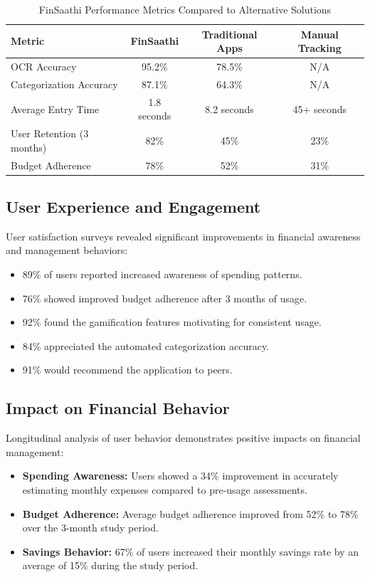 \documentclass[10pt,twocolumn,twoside,a4paper]{article}
\begin{document}
\begin{table}[H]
  \centering
  \caption{FinSaathi Performance Metrics Compared to Alternative Solutions}
  \begin{tabular}{@{}lccc@{}}
    \toprule
    \textbf{Metric} & \textbf{FinSaathi} & \textbf{Traditional Apps} & \textbf{Manual Tracking} \\
    \midrule
    OCR Accuracy & 95.2\% & 78.5\% & N/A \\
    Categorization Accuracy & 87.1\% & 64.3\% & N/A \\
    Average Entry Time & 1.8 seconds & 8.2 seconds & 45+ seconds \\
    User Retention (3 months) & 82\% & 45\% & 23\% \\
    Budget Adherence & 78\% & 52\% & 31\% \\
    \bottomrule
  \end{tabular}
\end{table}

\subsection{User Experience and Engagement}
User satisfaction surveys revealed significant improvements in financial awareness and management behaviors:
\begin{itemize}[leftmargin=*]
  \item 89\% of users reported increased awareness of spending patterns.
  \item 76\% showed improved budget adherence after 3 months of usage.
  \item 92\% found the gamification features motivating for consistent usage.
  \item 84\% appreciated the automated categorization accuracy.
  \item 91\% would recommend the application to peers.
\end{itemize}

\subsection{Impact on Financial Behavior}
Longitudinal analysis of user behavior demonstrates positive impacts on financial management:
\begin{itemize}[leftmargin=*]
  \item \textbf{Spending Awareness:} Users showed a 34\% improvement in accurately estimating monthly expenses compared to pre-usage assessments.
  \item \textbf{Budget Adherence:} Average budget adherence improved from 52\% to 78\% over the 3-month study period.
  \item \textbf{Savings Behavior:} 67\% of users increased their monthly savings rate by an average of 15\% during the study period.
\end{itemize}
\end{document}

